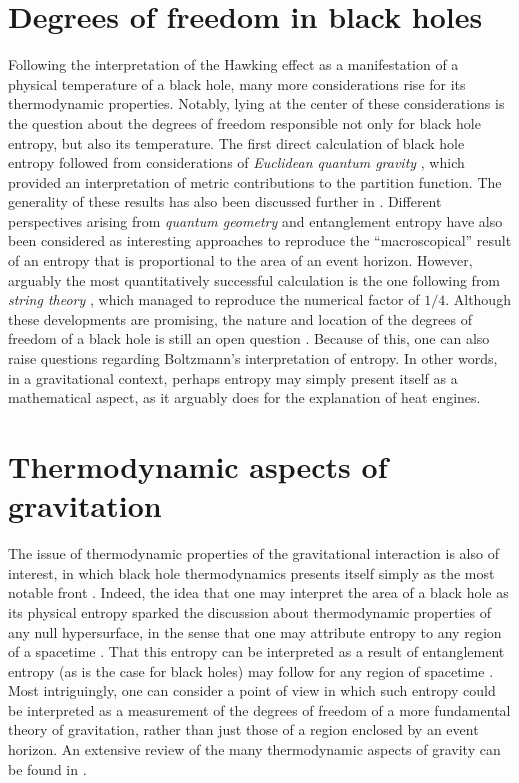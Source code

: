 \documentclass[
12pt,		%
openright,	%
twoside,  %
a4paper,			%
chapter=TITLE,		%
english,			%
french,				%
spanish,			%
brazil				%
]{USPSC-classe/USPSC}
\begin{document}
\section{Degrees of freedom in black holes}

Following the interpretation of the Hawking effect as a manifestation of a physical temperature of a black hole, many more considerations rise for its thermodynamic properties. Notably, lying at the center of these considerations is the question about the degrees of freedom responsible not only for black hole entropy, but also its temperature. The first direct calculation of black hole entropy followed from considerations of \textit{Euclidean quantum gravity} \cite{Gibbons1977b,Gibbons1993}, which provided an interpretation of metric contributions to the partition function. The generality of these results has also been discussed further in \cite{Iyer1995,Hawking2005}. Different perspectives arising from \textit{quantum geometry} \cite{Ashtekar1998} and entanglement entropy
\cite{Bombelli1986, Solodukhin2011} have also been considered as interesting approaches to reproduce the ``macroscopical'' result of an entropy that is proportional to the area of an event horizon. However, arguably the most quantitatively successful calculation is the one following from \textit{string theory} \cite{Strominger1996,Maldacena1997,Horowitz1998,Hubeny2015}, which managed to reproduce the numerical factor of $1/4$. Although these developments are promising, the nature and location of the degrees of freedom of a black hole is still an open question \cite{Wald2001}. Because of this, one can also raise questions regarding Boltzmann's interpretation of entropy. In other words, in a gravitational context, perhaps entropy may simply present itself as a mathematical aspect, as it arguably does for the explanation of heat engines. 

\section{Thermodynamic aspects of gravitation}

The issue of thermodynamic properties of the gravitational interaction is also of interest, in which black hole thermodynamics presents itself simply as the most notable front \cite{Wald2001, Mathur2023}. Indeed, the idea that one may interpret the area of a black hole as its physical entropy sparked the discussion about thermodynamic properties of any null hypersurface, in the sense that one may attribute entropy to any region of a spacetime \cite{Srednicki1993}. That this entropy can be interpreted as a result of entanglement entropy (as is the case for black holes) may follow for any region of spacetime \cite{Raamsdonk2010}. Most intriguingly, one can consider a point of view in which such entropy could be interpreted as a measurement of the degrees of freedom of a more fundamental theory of gravitation, rather than just those of a region enclosed by an event horizon. An extensive review of the many thermodynamic aspects of gravity can be found in \cite{Chirco2011}.
\end{document}
